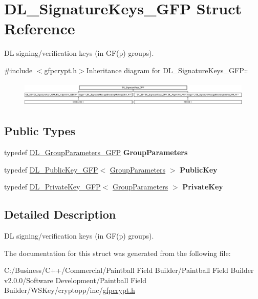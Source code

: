 \hypertarget{struct_d_l___signature_keys___g_f_p}{
\section{DL\_\-SignatureKeys\_\-GFP Struct Reference}
\label{struct_d_l___signature_keys___g_f_p}
}


DL signing/verification keys (in GF(p) groups).  


{\ttfamily \#include $<$gfpcrypt.h$>$}Inheritance diagram for DL\_\-SignatureKeys\_\-GFP::\begin{figure}[H]
\begin{center}
\leavevmode
\includegraphics[height=1.21212cm]{struct_d_l___signature_keys___g_f_p}
\end{center}
\end{figure}
\subsection*{Public Types}
\begin{DoxyCompactItemize}
\item 
\hypertarget{struct_d_l___signature_keys___g_f_p_a8cfc9c16dc935bb5886db63120db4666}{
typedef \hyperlink{class_d_l___group_parameters___g_f_p}{DL\_\-GroupParameters\_\-GFP} {\bfseries GroupParameters}}
\label{struct_d_l___signature_keys___g_f_p_a8cfc9c16dc935bb5886db63120db4666}

\item 
\hypertarget{struct_d_l___signature_keys___g_f_p_a21c8ecad310fec227efb7495a2d826a5}{
typedef \hyperlink{class_d_l___public_key___g_f_p}{DL\_\-PublicKey\_\-GFP}$<$ \hyperlink{class_d_l___group_parameters___g_f_p}{GroupParameters} $>$ {\bfseries PublicKey}}
\label{struct_d_l___signature_keys___g_f_p_a21c8ecad310fec227efb7495a2d826a5}

\item 
\hypertarget{struct_d_l___signature_keys___g_f_p_affa2c06ef72c51a673ad91993dd772ab}{
typedef \hyperlink{class_d_l___private_key___g_f_p}{DL\_\-PrivateKey\_\-GFP}$<$ \hyperlink{class_d_l___group_parameters___g_f_p}{GroupParameters} $>$ {\bfseries PrivateKey}}
\label{struct_d_l___signature_keys___g_f_p_affa2c06ef72c51a673ad91993dd772ab}

\end{DoxyCompactItemize}


\subsection{Detailed Description}
DL signing/verification keys (in GF(p) groups). 

The documentation for this struct was generated from the following file:\begin{DoxyCompactItemize}
\item 
C:/Business/C++/Commercial/Paintball Field Builder/Paintball Field Builder v2.0.0/Software Development/Paintball Field Builder/WSKey/cryptopp/inc/\hyperlink{gfpcrypt_8h}{gfpcrypt.h}\end{DoxyCompactItemize}
